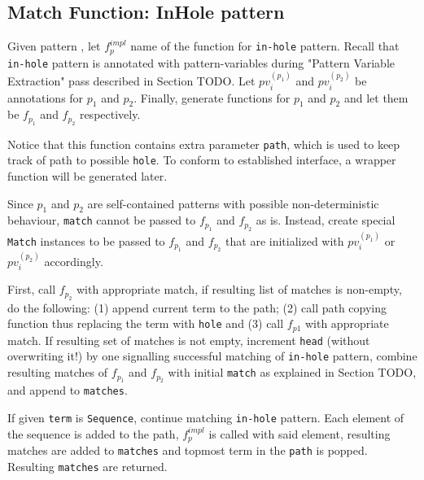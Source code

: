 \subsection{Match Function: InHole pattern}
Given pattern \InHolePattern, let $f_p^{impl}$ name of the function for \texttt{in-hole} pattern. Recall that \texttt{in-hole} pattern is annotated with pattern-variables during "Pattern Variable Extraction" pass described in Section TODO. Let $pv_i^{(p_1)}$ and $pv_i^{(p_2)}$ be annotations for $p_1$ and $p_2$. Finally, generate functions for $p_1$ and $p_2$ and let them be $f_{p_1}$ and $f_{p_2}$ respectively. 

Notice that this function contains extra parameter \texttt{path}, which is used to keep track of path to possible \texttt{hole}. To conform to established interface, a wrapper function will be generated later.

Since $p_1$ and $p_2$ are self-contained patterns with possible non-deterministic behaviour, \texttt{match} cannot be passed to $f_{p_1}$ and $f_{p_2}$ as is. Instead, create special \texttt{Match} instances to be passed to $f_{p_1}$ and $f_{p_2}$ that are initialized with $pv_i^{(p_1)}$ or $pv_i^{(p_2)}$ accordingly.

First, call $f_{p_2}$ with appropriate match, if resulting list of matches is non-empty, do the following: (1) append current term to the path; (2) call path copying function thus replacing the term with \texttt{hole} and (3) call $f_{p1}$ with appropriate match. If resulting set of matches is not empty, increment \texttt{head} (without overwriting it!) by one signalling successful matching of \texttt{in-hole} pattern, combine resulting matches of $f_{p_1}$ and $f_{p_2}$ with initial \texttt{match} as explained in Section TODO, and append to \texttt{matches}.

If given \texttt{term} is \texttt{Sequence}, continue matching \texttt{in-hole} pattern. Each element of the sequence is added to the path, $f_p^{impl}$ is called with said element, resulting matches are added to \texttt{matches} and topmost term in the \texttt{path} is popped. Resulting \texttt{matches} are returned.

